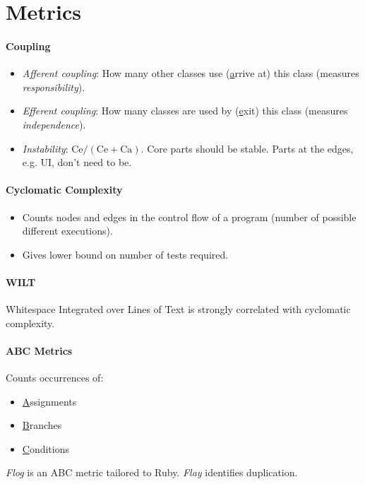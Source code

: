 \documentclass[twocolumn,english]{article}
\begin{document}
\section{Metrics}

\paragraph{Coupling}
\begin{itemize}
\item \emph{Afferent coupling}: How many other classes use (\uline{a}rrive
at) this class (measures \emph{responsibility}).
\item \emph{Efferent coupling}: How many classes are used by (\uline{e}xit)
this class (measures \emph{independence}).
\item \emph{Instability}: $\text{Ce}/\left(\text{Ce}+\text{Ca}\right)$.
Core parts should be stable. Parts at the edges, e.g. UI, don't need
to be.
\end{itemize}

\paragraph{Cyclomatic Complexity}
\begin{itemize}
\item Counts nodes and edges in the control flow of a program (number of
possible different executions).
\item Gives lower bound on number of tests required.
\end{itemize}

\paragraph{WILT}

Whitespace Integrated over Lines of Text is strongly correlated with
cyclomatic complexity.

\paragraph{ABC Metrics}

Counts occurrences of:
\begin{itemize}
\item \uline{A}ssignments
\item \uline{B}ranches
\item \uline{C}onditions
\end{itemize}
\emph{Flog} is an ABC metric tailored to Ruby. \emph{Flay} identifies
duplication.
\end{document}

